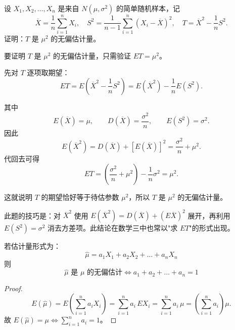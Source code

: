﻿\documentclass[lang=cn,11pt]{elegantbook}
\begin{document}
\begin{exercise}[无偏估计的构造与验证] \label{ex:unbiased_05}
设 \(X_1,X_2,\dots,X_n\) 是来自 \(N(\mu,\sigma^2)\) 的简单随机样本，记
\[
\overline{X}=\frac{1}{n}\sum_{i=1}^{n}X_i,\quad S^2=\frac{1}{n-1}\sum_{i=1}^{n}(X_i-\overline{X})^2,\quad T=\overline{X}^2-\frac{1}{n}S^2.
\]
证明：\(T\) 是 \(\mu^2\) 的无偏估计量。
\end{exercise}
\begin{solution}
要证明 \(T\) 是 \(\mu^2\) 的无偏估计量，只需验证 \(ET=\mu^2\)。

先对 \(T\) 逐项取期望：
\[
ET=E\!\left(\overline{X}^2-\frac{1}{n}S^2\right)
=E(\overline{X}^2)-\frac{1}{n}E(S^2).
\]

其中
\[
E(\overline{X})=\mu,\qquad D(\overline{X})=\frac{\sigma^2}{n},\qquad E(S^2)=\sigma^2.
\]
因此
\[
E(\overline{X}^2)=D(\overline{X})+[E(\overline{X})]^2
=\frac{\sigma^2}{n}+\mu^2.
\]
代回去可得
\[
ET=\left(\frac{\sigma^2}{n}+\mu^2\right)-\frac{1}{n}\sigma^2=\mu^2.
\]

这就说明 \(T\) 的期望恰好等于待估参数 \(\mu^2\)，所以 \(T\) 是 \(\mu^2\) 的无偏估计量。

\begin{note}
此题的技巧是：对 \(\overline{X}^2\) 使用 \(E(\overline{X}^2)=D(\overline{X})+(E\overline{X})^2\) 展开，再利用 \(E(S^2)=\sigma^2\) 消去方差项。此结论在数学三中也常以"求 \(ET\)"的形式出现。
\end{note}
\end{solution}



\begin{proposition}[系数和为1]\label{prop:unbiased-coeff}
若估计量形式为：
\[
\hat \mu = a_1 X_1 + a_2 X_2 + \dots + a_n X_n
\]
则
\[
\hat\mu \text{ 是 } \mu \text{ 的无偏估计} \iff a_1+a_2+\dots+a_n=1
\]
\end{proposition}
\begin{proof}
\[
E(\hat{\mu}) = E\!\left(\sum_{i=1}^{n}a_i X_i\right) = \sum_{i=1}^{n}a_i\,EX_i = \sum_{i=1}^{n}a_i\,\mu = \left(\sum_{i=1}^{n}a_i\right)\mu.
\]
故 \(E(\hat{\mu})=\mu \iff \displaystyle\sum_{i=1}^{n}a_i = 1\)。
\end{proof}
\end{document}

